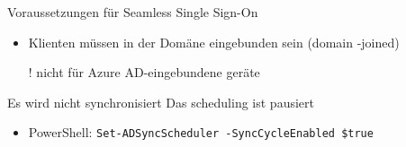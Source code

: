 \begin{flashcard}[Definition]{Voraussetzungen für Seamless Single Sign-On}
    \begin{itemize}
        \item Klienten müssen in der Domäne eingebunden sein (domain -joined)
        \item[!] nicht für Azure AD-eingebundene geräte
    \end{itemize}
\end{flashcard}


\begin{flashcard}[Definition]{Es wird nicht synchronisiert}
    Das scheduling ist pausiert
    \begin{itemize}
        \item PowerShell:\newline
            \texttt{Set-ADSyncScheduler -SyncCycleEnabled \$true}
    \end{itemize}
\end{flashcard}


